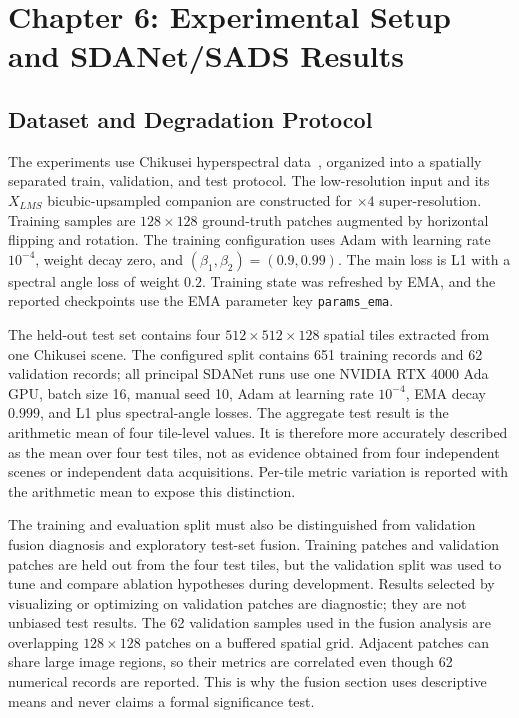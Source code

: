 \documentclass[10pt,twocolumn,letterpaper]{article}
\begin{document}
\section{Chapter 6: Experimental Setup and SDANet/SADS Results}
\label{sec:sads-results}

\subsection{Dataset and Degradation Protocol}

The experiments use Chikusei hyperspectral data~\cite{yokoya2016chikusei}, organized into a spatially separated train, validation, and test protocol. The low-resolution input and its $X_{LMS}$ bicubic-upsampled companion are constructed for $\times4$ super-resolution. Training samples are $128\times128$ ground-truth patches augmented by horizontal flipping and rotation. The training configuration uses Adam with learning rate $10^{-4}$, weight decay zero, and $(\beta_1,\beta_2)=(0.9,0.99)$. The main loss is L1 with a spectral angle loss of weight $0.2$. Training state was refreshed by EMA, and the reported checkpoints use the EMA parameter key \texttt{params\_ema}.

The held-out test set contains four $512\times512\times128$ spatial tiles extracted from one Chikusei scene. The configured split contains 651 training records and 62 validation records; all principal SDANet runs use one NVIDIA RTX 4000 Ada GPU, batch size 16, manual seed 10, Adam at learning rate $10^{-4}$, EMA decay $0.999$, and L1 plus spectral-angle losses. The aggregate test result is the arithmetic mean of four tile-level values. It is therefore more accurately described as the mean over four test tiles, not as evidence obtained from four independent scenes or independent data acquisitions. Per-tile metric variation is reported with the arithmetic mean to expose this distinction.

The training and evaluation split must also be distinguished from validation fusion diagnosis and exploratory test-set fusion. Training patches and validation patches are held out from the four test tiles, but the validation split was used to tune and compare ablation hypotheses during development. Results selected by visualizing or optimizing on validation patches are diagnostic; they are not unbiased test results. The 62 validation samples used in the fusion analysis are overlapping $128\times128$ patches on a buffered spatial grid. Adjacent patches can share large image regions, so their metrics are correlated even though 62 numerical records are reported. This is why the fusion section uses descriptive means and never claims a formal significance test.
\end{document}
